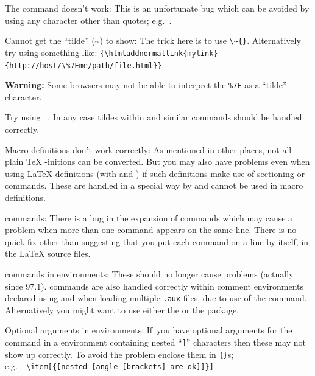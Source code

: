 \begin{htmllist}
\item [The \Lc{verb"ABC"} command doesn't work: ]
This is an unfortunate bug which can be avoided by using 
any character other than quotes; e.g.\ .

\item [Cannot get the ``tilde'' (\~{}) to show: \hfill]
The trick here is to use \verb|\~{}|.\html{\\}
Alternatively try using something like:
\verb|{\htmladdnormallink{mylink}{http://host/\%7Eme/path/file.html}}|. 

\textbf{Warning:} Some browsers may not be able to interpret the \verb|%7E|
as a ``tilde'' character.

Try using ~.
In any case tildes within  and similar commands
should be handled correctly.

\item [Macro definitions don't work correctly: ]
As mentioned in other places, not all plain \TeX{} -initions 
can be converted.
But you may also have problems even when using \LaTeX{} definitions
(with  and ) if such definitions
make use of sectioning or  commands. These are 
handled in a special way by \latextohtml{} and cannot be used in
macro definitions. 


\item [\Lc{input} commands: ]
There is a bug in the expansion of  commands which may cause
a problem when more than one  command appears on the same line.
There is no quick fix other than suggesting that you put each
 command on a line by itself, in the \LaTeX{} source files.

\item [\Lc{input} commands in \env{verbatim} environments: ]
These should no longer cause problems (actually since 97.1).
 commands are also handled correctly within comment environments
declared using  
and when loading multiple \texttt{.aux} files, 
due to use of the  command.
Alternatively you might want to use
either the  or the  package.

\item [Optional arguments in \env{description} environments: ]
If~you have optional arguments for the  command in 
a  environment containing nested ``\texttt{]}'' characters then 
these may not show up correctly. To avoid the problem enclose them
in \verb|{}|s;\\ e.g.\ \ \verb+\item[{[nested [angle [brackets] are ok]]}]+



\end{htmllist}
